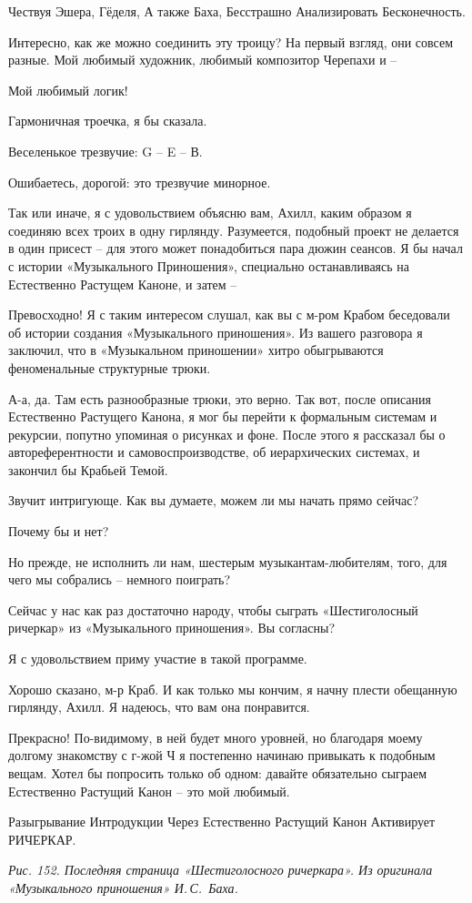 \documentclass[../main.tex]{subfiles}
\begin{document}
\begin{dialogue}
 Чествуя Эшера, Гёделя, А также Баха, Бесстрашно Анализировать Бесконечность.

 Интересно, как же можно соединить эту троицу? На первый взгляд, они совсем разные. Мой любимый художник, любимый композитор Черепахи и \---

 Мой любимый логик!

 Гармоничная троечка, я бы сказала.

 Веселенькое трезвучие: G \--- E \--- В.

 Ошибаетесь, дорогой: это трезвучие минорное.

 Так или иначе, я с удовольствием объясню вам, Ахилл, каким образом я соединяю всех троих в одну гирлянду. Разумеется, подобный проект не делается в один присест \--- для этого может понадобиться пара дюжин сеансов. Я бы начал с истории «Музыкального Приношения», специально останавливаясь на Естественно Растущем Каноне, и затем \---

 Превосходно! Я с таким интересом слушал, как вы с м-ром Крабом беседовали об истории создания «Музыкального приношения». Из вашего разговора я заключил, что в «Музыкальном приношении» хитро обыгрываются феноменальные структурные трюки.

 А-а, да. Там есть разнообразные трюки, это верно. Так вот, после описания Естественно Растущего Канона, я мог бы перейти к формальным системам и рекурсии, попутно упоминая о рисунках и фоне. После этого я рассказал бы о автореферентности и самовоспроизводстве, об иерархических системах, и закончил бы Крабьей Темой.

 Звучит интригующе. Как вы думаете, можем ли мы начать прямо сейчас?

 Почему бы и нет?

 Но прежде, не исполнить ли нам, шестерым музыкантам-любителям, того, для чего мы собрались \--- немного поиграть?

 Сейчас у нас как раз достаточно народу, чтобы сыграть «Шестиголосный ричеркар» из «Музыкального приношения». Вы согласны?

 Я с удовольствием приму участие в такой программе.

 Хорошо сказано, м-р Краб. И как только мы кончим, я начну плести обещанную гирлянду, Ахилл. Я надеюсь, что вам она понравится.

 Прекрасно! По-видимому, в ней будет много уровней, но благодаря моему долгому знакомству с г-жой Ч я постепенно начинаю привыкать к подобным вещам. Хотел бы попросить только об одном: давайте обязательно сыграем Естественно Растущий Канон \--- это мой любимый.

 Разыгрывание Интродукции Через Естественно Растущий Канон Активирует РИЧЕРКАР.

\emph{Рис. 152. Последняя страница «Шестиголосного ричеркара». Из оригинала «Музыкального приношения» И.\,С.~Баха.}

\end{dialogue}
\end{document}
